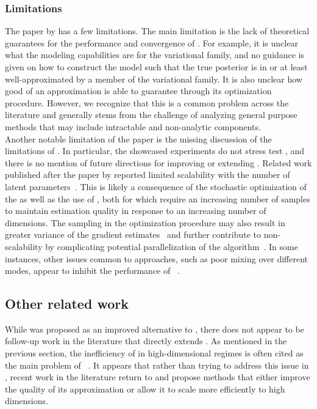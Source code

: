 \documentclass[10pt]{article}
\begin{document}
\subsubsection{Limitations}

The paper by \citet{Titsias:2019} has a few limitations. The main limitation is the lack of theoretical guarantees for the performance and convergence of \uivi. For example, it is unclear what the modeling capabilities are for the \uivi variational family, and no guidance is given on how to construct the model such that the true posterior is in or at least well-approximated by a member of the variational family. It is also unclear how good of an approximation \uivi is able to guarantee through its optimization procedure. However, we recognize that this is a common problem across the \vi literature and generally stems from the challenge of analyzing general purpose methods that may include intractable and non-analytic components.
\\

Another notable limitation of the paper is the missing discussion of the limitations of \uivi. In particular, the showcased experiments do not stress test \uivi, and there is no mention of future directions for improving or extending \uivi. Related work published after the paper by \citet{Titsias:2019} reported limited scalability with the number of latent parameters~\citep{Molchanova:2019,Moens:2021}. This is likely a consequence of the stochastic optimization of the \elbo as well as the use of \mcmc, both for which require an increasing number of samples to maintain estimation quality in response to an increasing number of dimensions. The \mcmc sampling in the \uivi optimization procedure may also result in greater variance of the \elbo gradient estimates~\citep{Betancourt:2015} and further contribute to non-scalability by complicating potential parallelization of the algorithm~\citep{Sobolev:2019}. In some instances, other issues common to \mcmc approaches, such as poor mixing over different modes, appear to inhibit the performance of \uivi~\citep{Sobolev:2019}. \todo


\subsection{Other related work} \label{an:postpaper}

While \uivi was proposed as an improved alternative to \sivi, there does not appear to be follow-up work in the literature that directly extends \uivi. As mentioned in the previous section, the inefficiency of \mcmc in high-dimensional regimes is often cited as the main problem of \uivi~\citep{Molchanova:2019,Moens:2021}. It appears that rather than trying to address this issue in \uivi, recent work in the literature return to \sivi and propose methods that either improve the quality of its approximation or allow it to scale more efficiently to high dimensions.
\\
\end{document}
